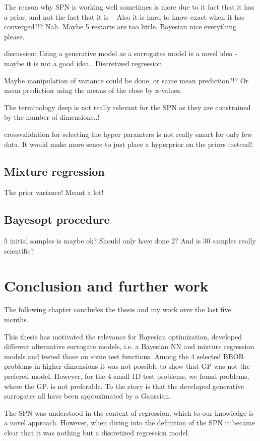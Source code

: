 The reason why SPN is working well sometimes is more due to it fact that it has a prior, 
and not the fact that it is -- Also it is hard to know exact when it has converged?!? Nah. 
Maybe 5 restarts are too little. Bayesian nice everything please. 


discussion: Using a generative model as a surrogates model is a novel idea - maybe it is not a good
idea.. Discretized regression

Maybe manipulation of variance could be done, or same mean prediction?!? Or 
mean prediction using the means of the close by x-values. 

The terminology deep is not really relevant for the SPN as they are constrained by the number of dimensions..!

crossvalidation for selecting the hyper paramters is not really smart for only few data. It would make more sence 
to just place a hyperprior on the priors instead!. 

\section{Mixture regression}
The prior variance! Meant a lot!



\section{Bayesopt procedure}
5 initial samples is maybe ok? Should only have done 2? 
And is 30 samples really scientific? 



\chapter{Conclusion and further work}
The following chapter concludes the thesis and my work over the last five months. 

This thesis has motivated the relevance for Bayesian optimization, developed different alternative
surrogate models, i.e. a Bayesian NN and mixture regression models and tested those on some 
test functions. Among the 4 selected BBOB problems in higher dimensions it was not possible to show that
GP was not the prefered model. However, for the 4 small 1D test problems, we found problems, where the GP. 
is not preferable. To the story is that the developed generative surrogates all have been approximated by
a Gaussian. 

The SPN was understood in the context of regression, which to our knowledge is a novel approach. However, 
when diving into the definition of the SPN it became clear that it was nothing but a discretized regression model. 

